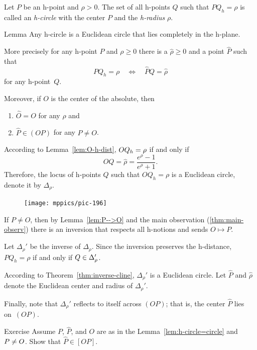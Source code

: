 Let $P$ be an h-point and $\rho>0$.
The set of all h-points $Q$ such that $PQ_h=\rho$ is called an \emph{h-circle} with the center $P$ and the \emph{h-radius} $\rho$.

\begin{thm}{Lemma}\label{lem:h-circle=circle}
Any h-circle is a Euclidean circle that lies completely in the h-plane.

More precisely for any h-point $P$ and $\rho\ge 0$
there is a $\hat\rho\ge 0$ and a point $\hat P$ such that 
$$PQ_h= \rho
\quad 
\iff
\quad
\hat PQ= \hat\rho$$
for any h-point~$Q$.

Moreover, if $O$ is the center of the absolute, then 
\begin{enumerate}
\item $\hat O=O$ for any $\rho$ and
\item $\hat P\in (OP)$ for any $P\ne O$.
\end{enumerate}

\end{thm}

According to Lemma~\ref{lem:O-h-dist}, 
$OQ_h\z= \rho$ if and only if $$OQ= \hat\rho=\frac{e^\rho-1}{e^\rho+1}.$$
Therefore, the locus of h-points $Q$ such that $OQ_h= \rho$ is a Euclidean circle, 
denote it by $\Delta_\rho$.

\begin{figure}
\vskip-3mm
\centering
\texttt{[image: mppics/pic-196]}
\end{figure}

If $P\ne O$, then by Lemma~\ref{lem:P-->O} and the main observation (\ref{thm:main-observ})
there is an inversion that respects all h-notions and sends $O\mapsto P$.

Let $\Delta_\rho'$ be the inverse of $\Delta_\rho$.
Since the inversion preserves the h-distance,
$PQ_h=\rho$ if and only if $Q\z\in\Delta_\rho'$.

According to Theorem~\ref{thm:inverse-cline}, $\Delta_\rho'$ is a Euclidean circle.
Let $\hat P$ and $\hat\rho$ denote the Euclidean center and radius of $\Delta_\rho'$.

Finally, note that $\Delta_\rho'$ reflects to itself across $(OP)$;
that is, the center $\hat P$ lies on~$(OP)$.
\qeds

\begin{thm}{Exercise}\label{ex:h-circle=circle}
Assume $P$, $\hat P$, and $O$ are as in the Lemma~\ref{lem:h-circle=circle} and $P\z\ne O$.
Show that $\hat P\in [OP]$.
\end{thm}

